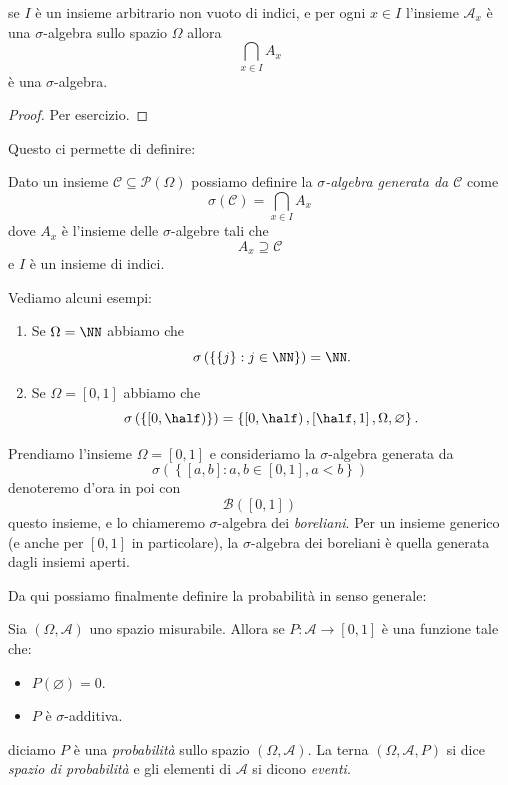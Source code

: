 \documentclass[11pt]{scrartcl}
\newcommand{\parti}[1]{\mathcal{P}\!\left(#1\right)}
\newcommand{\eset}{\varnothing}
\begin{document}
	\begin{lemma}
		se $I$ è un insieme arbitrario non vuoto di indici, e per ogni $x\in I$ l'insieme $\mathcal{A}_x$ è una $\sigma$-algebra sullo spazio $\Omega$ allora 
		$$\bigcap_{x\in I}A_x$$
		è una $\sigma$-algebra.
	\end{lemma}
	\begin{proof}
		Per esercizio.
	\end{proof}
	Questo ci permette di definire:
	\begin{definition}
		Dato un insieme $\mathcal{C}\subseteq \parti{\Omega}$ possiamo definire la \textit{$\sigma$-algebra generata da $\mathcal{C}$} come 
		$$\sigma\left(\mathcal{C}\right)=\bigcap_{x\in I}A_x$$
		dove $A_x$ è l'insieme delle $\sigma$-algebre tali che 
		$$A_x\supseteq \mathcal{C}$$
		e $I$ è un insieme di indici.
	\end{definition}
	\begin{example}
		Vediamo alcuni esempi:
		\begin{enumerate}
			\item Se $\Omega=\NN$ abbiamo che 
			$$\sigma\left(\left\{\left\{j\right\}:j\in\NN\right\}\right)=\NN.$$
			\item Se $\Omega=[0,1]$ abbiamo che 
			$$\sigma\left(\left\{\left[0,\half\right)\right\}\right)=\left\{\left[0,\half\right),\left[\half,1\right],\Omega,\eset\right\}.$$
		\end{enumerate}
	\end{example}
	\begin{definition}[Boreliani]
		Prendiamo l'insieme $\Omega=[0,1]$ e consideriamo la $\sigma$-algebra generata da
		$$\sigma\left(\left\{[a,b]:a,b\in [0,1],a<b\right\}\right)$$
		denoteremo d'ora in poi con 
		$$\mathcal{B}\left(\left[0,1\right]\right)$$
		questo insieme, e lo chiameremo $\sigma$-algebra dei \textit{boreliani}. Per un insieme generico (e anche per $[0,1]$ in particolare), la $\sigma$-algebra dei boreliani è quella generata dagli insiemi aperti.
	\end{definition}
	Da qui possiamo finalmente definire la probabilità in senso generale:
	\begin{definition}
		Sia $(\Omega,\mathcal{A})$ uno spazio misurabile. Allora se $P:\mathcal{A}\to[0,1]$ è una funzione tale che:
		\begin{itemize}
			\item $P(\eset)=0$.
			\item $P$ è $\sigma$-additiva.
		\end{itemize}
		diciamo $P$ è una \textit{probabilità} sullo spazio $(\Omega,\mathcal{A})$. La terna 
		$(\Omega,\mathcal{A},P)$ si dice \textit{spazio di probabilità} e gli elementi di $\mathcal{A}$ si dicono \textit{eventi}.
	\end{definition}
\end{document}
